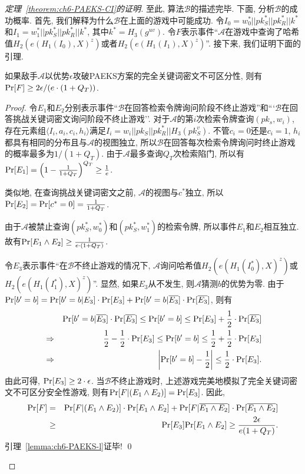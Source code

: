 \begin{proof}[定理~\ref{theorem:ch6-PAEKS-CI}的证明]
至此, 算法$\mathcal{B}$的描述完毕. 下面, 分析$\mathcal{B}$的成功概率. 首先, 我们解释为什么$\mathcal{B}$在上面的游戏中可能成功. 令$I_0 = w_0^*||pk_S^*||pk_R^*||k^*$和$I_1 = w_1^*||pk_S^*||pk_R^*||k^*$, 其中$k^* = H_3(g^{uv})$. 令$F$表示事件``$\mathcal{A}$在游戏中查询了哈希值$H_2(e(H_1(I_0), X)^z)$或者$H_2(e(H_1(I_1), X)^z)$''. 接下来, 我们证明下面的引理.
\begin{lemma}\label{lemma:ch6-PAEKS-l}
如果敌手$\mathcal{A}$以优势$\epsilon$攻破PAEKS方案的完全关键词密文不可区分性, 则有$\textup{Pr}[F] \geq 2 \epsilon / (e \cdot (1+Q_T))$. 
\end{lemma}
\begin{proof}
令$E_1$和$E_2$分别表示事件``$\mathcal{B}$在回答检索令牌询问阶段不终止游戏''和```$\mathcal{B}$在回答挑战关键词密文询问阶段不终止游戏''. 对于$\mathcal{A}$的第$i$次检索令牌查询$(pk_s, w_i)$, 存在元素组$\langle I_i, a_i, c_i, h_i\rangle$满足$I_i = w_i||pk_S||pk_R^*||H_3(pk_S^v)$. 不管$c_i = 0$还是$c_i = 1$, $h_i$都具有相同的分布且与$\mathcal{A}$的视图独立, 所以$\mathcal{B}$在回答每次检索令牌询问时终止游戏的概率最多为$1/(1 + Q_T)$. 由于$\mathcal{A}$最多查询$Q_T$次检索陷门, 所以有$\textup{Pr}[E_1] = \left( 1 - \frac{1}{1 + Q_T}\right)^{Q_T} \geq \frac{1}{e}$.

类似地, 在查询挑战关键词密文之前, $\mathcal{A}$的视图与$c^*$独立, 所以$\textup{Pr}[E_2] = \textup{Pr}[c^* = 0] = \frac{1}{1 + Q_T}$.

由于$\mathcal{A}$被禁止查询$(pk_S^*, w_0^*)$和$(pk_S^*, w_1^*)$的检索令牌, 所以事件$E_1$和$E_2$相互独立. 故有$\textup{Pr}[E_1 \land E_2] \geq \frac{1}{e \cdot (1+Q_T)}$.

令$E_3$表示事件``在$\mathcal{B}$不终止游戏的情况下, $\mathcal{A}$询问哈希值$H_2(e(H_1(I_0^*), X)^z)$或$H_2(e(H_1(I_1^*), X)^z)$''. 显然, 如果$E_3$从不发生, 则$\mathcal{A}$猜测$b$的优势为零. 由于$\textup{Pr}[b' = b] = \textup{Pr}[b' = b|E_3] \cdot \textup{Pr}[E_3]+\textup{Pr}[b' = b| \overline{E_3}] \cdot \textup{Pr}[\overline{E_3}]$, 则有
\begin{eqnarray*}
&&\textup{Pr}[b'=b|\overline{E_3}]\cdot \textup{Pr}[\overline{E_3}]\leq \textup{Pr}[b'=b]\leq \textup{Pr}[E_3]+\frac{1}{2}\cdot\textup{Pr}[\overline{E_3}]\\
&\Rightarrow & \frac{1}{2}-\frac{1}{2}\cdot\textup{Pr}[E_3]\leq \textup{Pr}[b'=b]\leq \frac{1}{2}+\frac{1}{2}\cdot\textup{Pr}[E_3]\\
&\Rightarrow &\left|\textup{Pr}[b'=b]-\frac{1}{2}\right|\leq \frac{1}{2}\cdot\textup{Pr}[E_3].
\end{eqnarray*} 
由此可得, $\textup{Pr}[E_3] \geq 2 \cdot \epsilon$. 当$\mathcal{B}$不终止游戏时, 上述游戏完美地模拟了完全关键词密文不可区分安全性游戏, 则有$\textup{Pr}[F|(E_1 \land E_2)] = \textup{Pr}[E_3]$. 因此,
\begin{eqnarray*}
\textup{Pr}[F]& = &\textup{Pr}[F|(E_1 \land E_2)] \cdot \textup{Pr}[E_1 \land E_2]+\textup{Pr}[F|\overline{E_1 \land E_2}] \cdot \textup{Pr}[\overline{E_1 \land E_2}]\\
& \geq & \textup{Pr}[E_3] \textup{Pr}[E_1 \land E_2] \geq \frac{2 \epsilon}{e(1+Q_T)}.
\end{eqnarray*} 
引理~\ref{lemma:ch6-PAEKS-l}证毕! \qed
\end{proof}


\end{proof}
